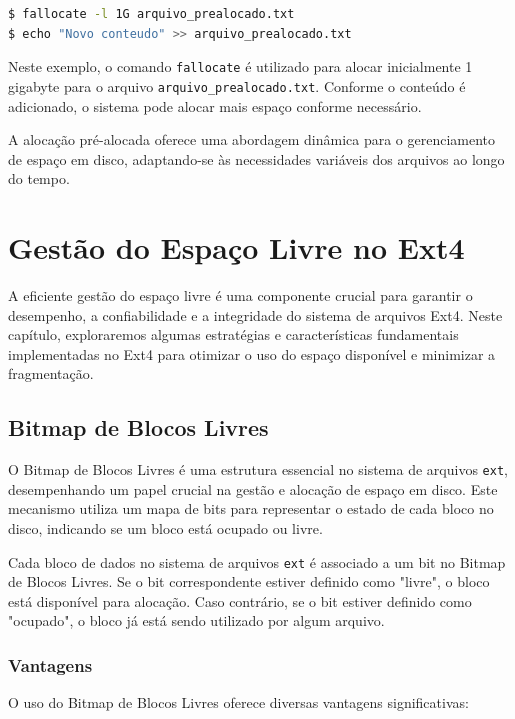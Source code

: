 \documentclass[
	12pt,				%
	openright,			%
	oneside,			%
	a4paper,			%
	chapter=TITLE,		%
	english,			%
	french,				%
	spanish,			%
	brazil				%
	]{abntex2}
\theoremstyle{definition}
\begin{document}
\begin{lstlisting}[language=bash, caption={Exemplo de Alocação Pré-Alocada}]
$ fallocate -l 1G arquivo_prealocado.txt  
$ echo "Novo conteudo" >> arquivo_prealocado.txt   
\end{lstlisting}

Neste exemplo, o comando \texttt{fallocate} é utilizado para alocar inicialmente 1 gigabyte para o arquivo \texttt{arquivo\_prealocado.txt}. Conforme o conteúdo é adicionado, o sistema pode alocar mais espaço conforme necessário.

A alocação pré-alocada oferece uma abordagem dinâmica para o gerenciamento de espaço em disco, adaptando-se às necessidades variáveis dos arquivos ao longo do tempo.

\chapter{Gestão do Espaço Livre no Ext4}

A eficiente gestão do espaço livre é uma componente crucial para garantir o desempenho, a confiabilidade e a 
integridade do sistema de arquivos Ext4. Neste capítulo, exploraremos algumas estratégias e características 
fundamentais implementadas no Ext4 para otimizar o uso do espaço disponível e minimizar a fragmentação.

\section{Bitmap de Blocos Livres}

O Bitmap de Blocos Livres é uma estrutura essencial no sistema de arquivos \texttt{ext}, desempenhando um papel crucial na gestão e alocação de espaço em disco. Este mecanismo utiliza um mapa de bits para representar o estado de cada bloco no disco, indicando se um bloco está ocupado ou livre.

Cada bloco de dados no sistema de arquivos \texttt{ext} é associado a um bit no Bitmap de Blocos Livres. Se o bit correspondente estiver definido como "livre", o bloco está disponível para alocação. Caso contrário, se o bit estiver definido como "ocupado", o bloco já está sendo utilizado por algum arquivo.

\subsection{Vantagens}
O uso do Bitmap de Blocos Livres oferece diversas vantagens significativas:
\end{document}
